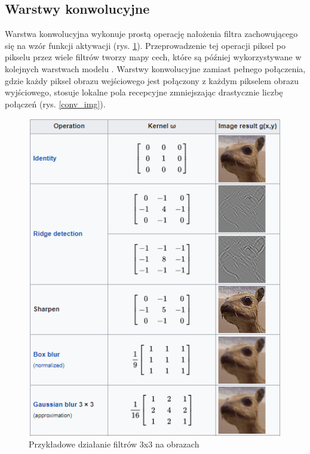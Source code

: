\documentclass[a4paper,12pt,oneside]{book} %
\begin{document}
\subsection{Warstwy konwolucyjne}
\label{konw}

Warstwa konwolucyjna wykonuje prostą operację nałożenia filtra zachowującego się na wzór funkcji aktywacji (rys. \ref{conv_filter}). Przeprowadzenie tej operacji piksel po pikselu przez wiele filtrów tworzy mapy cech, które są później wykorzystywane w kolejnych warstwach modelu \cite{9388351}. Warstwy konwolucyjne zamiast pełnego połączenia, gdzie każdy piksel obrazu wejściowego jest połączony z każdym pikselem obrazu wyjściowego, stosuje lokalne pola recepcyjne zmniejszając drastycznie liczbę połączeń (rys. \ref{conv_img}).

\begin{figure}[h]
	\centering
	\includegraphics[scale=0.9]{conv_filter.png}
	\caption{Przykładowe działanie filtrów 3x3 na obrazach \cite{wikipedia_filterkernel}}
	\label{conv_filter}
\end{figure}
\end{document}
